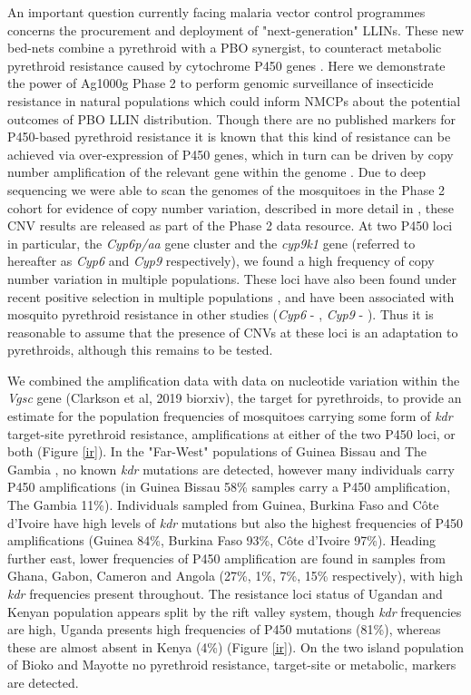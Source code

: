 \documentclass[a4paper,11pt,abstracton,hidelinks]{scrartcl}
\begin{document}
%
An important question currently facing malaria vector control programmes concerns the procurement and deployment of "next-generation" LLINs.
%
These new bed-nets combine a pyrethroid with a PBO synergist, to counteract metabolic pyrethroid resistance caused by cytochrome P450 genes \cite{churcher2016, killeen2018, toe2018}.
%
Here we demonstrate the power of Ag1000g Phase 2 to perform genomic surveillance of insecticide resistance in natural populations which could inform NMCPs about the potential outcomes of PBO LLIN distribution.
%
Though there are no published markers for P450-based pyrethroid resistance it is known that this kind of resistance can be achieved via over-expression of P450 genes, which in turn can be driven by copy number amplification of the relevant gene within the genome \cite{riveron2014, muller2008}.
%
Due to deep sequencing we were able to scan the genomes of the mosquitoes in the Phase 2 cohort for evidence of copy number variation, described in more detail in \cite{lucas2019}, these CNV results are released as part of the Phase 2 data resource.
%
At two P450 loci in particular, the \textit{Cyp6p/aa} gene cluster and the \textit{cyp9k1} gene (referred to hereafter as \textit{Cyp6} and \textit{Cyp9} respectively), we found a high frequency of copy number variation in multiple populations.
%
These loci have also been found under recent positive selection in multiple populations \cite{Ag1000gConsortium2017}, and have been associated with mosquito pyrethroid resistance in other studies (\textit{Cyp6} - \cite{nikou2003, edi2014, faucon2015, main2018}, \textit{Cyp9} - \cite{main2018, tchigossou2018, vontas2018}).
%
Thus it is reasonable to assume that the presence of CNVs at these loci is an adaptation to pyrethroids, although this remains to be tested.


We combined the amplification data with data on nucleotide variation within the \textit{Vgsc} gene (Clarkson et al, 2019 biorxiv), the target for pyrethroids, to provide an estimate for the population frequencies of mosquitoes carrying some form of \textit{kdr} target-site pyrethroid resistance, amplifications at either of the two P450 loci, or both (Figure \ref{ir}). 
%
In the "Far-West" populations of Guinea Bissau and The Gambia \cite{caputo2011}, no known \textit{kdr} mutations are detected, however many individuals carry P450 amplifications (in Guinea Bissau 58\% samples carry a P450 amplification, The Gambia 11\%).
%
Individuals sampled from Guinea, Burkina Faso and C\^{o}te d'Ivoire have high levels of \textit{kdr} mutations but also the highest frequencies of P450 amplifications (Guinea 84\%, Burkina Faso 93\%, C\^{o}te d'Ivoire 97\%).
%
Heading further east, lower frequencies of P450 amplification are found in samples from Ghana, Gabon, Cameron and Angola (27\%, 1\%, 7\%, 15\% respectively), with high \textit{kdr} frequencies present throughout.
%
The resistance loci status of Ugandan and Kenyan population appears split by the rift valley system, though \textit{kdr} frequencies are high, Uganda presents high frequencies of P450 mutations (81\%), whereas these are almost absent in Kenya (4\%) (Figure \ref{ir}).
%
On the two island population of Bioko and Mayotte no pyrethroid resistance, target-site or metabolic, markers are detected.
\end{document}
